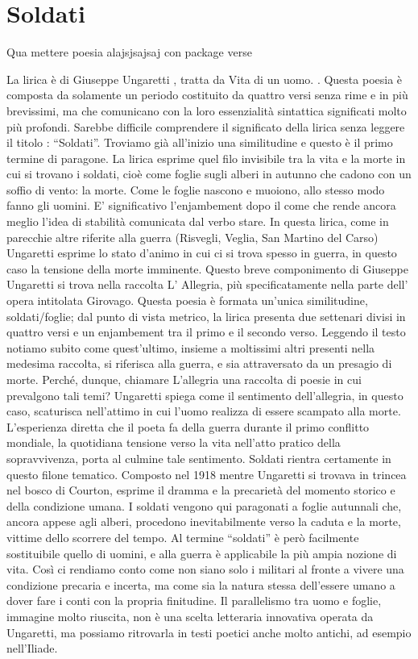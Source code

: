 \section{Soldati}
Qua mettere poesia alajsjsajsaj con package verse

La lirica è di Giuseppe Ungaretti , tratta da Vita di un uomo. .
Questa poesia è composta da solamente un periodo costituito da quattro versi senza rime e in più brevissimi, ma che comunicano con la loro essenzialità sintattica significati molto più profondi.
Sarebbe difficile comprendere il significato della lirica senza leggere il titolo : “Soldati”.
Troviamo già all’inizio una similitudine e questo è il primo termine di paragone. La lirica esprime quel filo invisibile tra la vita e la morte in cui si trovano i soldati, cioè come foglie sugli alberi in autunno che cadono con un soffio di vento: la morte. Come le foglie nascono e muoiono, allo stesso modo fanno gli uomini.
E’ significativo l’enjambement dopo il come che rende ancora meglio l’idea di stabilità comunicata dal verbo stare.
In questa lirica, come in parecchie altre riferite alla guerra (Risvegli, Veglia, San Martino del Carso) Ungaretti esprime lo stato d’animo in cui ci si trova spesso in guerra, in questo caso la tensione della morte imminente.
Questo breve componimento di Giuseppe Ungaretti  si trova nella raccolta L’ Allegria, più specificatamente nella parte dell’ opera intitolata Girovago. Questa poesia è formata un’unica similitudine, soldati/foglie; dal punto di vista metrico, la lirica presenta due settenari divisi in quattro versi e un enjambement tra il primo e il secondo verso.
Leggendo il testo notiamo subito come quest’ultimo, insieme a moltissimi altri presenti nella medesima raccolta, si riferisca alla guerra, e sia attraversato da un presagio di morte.
Perché, dunque, chiamare L’allegria una raccolta di poesie in cui prevalgono tali temi?
Ungaretti spiega come il sentimento dell’allegria, in questo caso, scaturisca nell’attimo in cui l’uomo realizza di essere scampato alla morte. L’esperienza diretta che il poeta fa della guerra durante il primo conflitto mondiale, la quotidiana tensione verso la vita nell’atto pratico della sopravvivenza, porta al culmine tale sentimento. Soldati rientra certamente in questo filone tematico. Composto nel 1918 mentre Ungaretti si trovava in trincea nel bosco di Courton, esprime il dramma e la precarietà del momento storico e della condizione umana. I soldati vengono qui paragonati a foglie autunnali che, ancora appese agli alberi, procedono inevitabilmente verso la caduta e la morte, vittime dello scorrere del tempo.
Al termine “soldati” è però facilmente sostituibile quello di uomini, e alla guerra è applicabile la più ampia nozione di vita. Così ci rendiamo conto come non siano solo i militari al fronte a vivere una condizione precaria e incerta, ma come sia la natura stessa dell’essere umano a dover fare i conti con la propria finitudine.
Il parallelismo tra uomo e foglie, immagine molto riuscita, non è una scelta letteraria innovativa operata da Ungaretti, ma possiamo ritrovarla in testi poetici anche molto antichi, ad esempio nell’Iliade.
